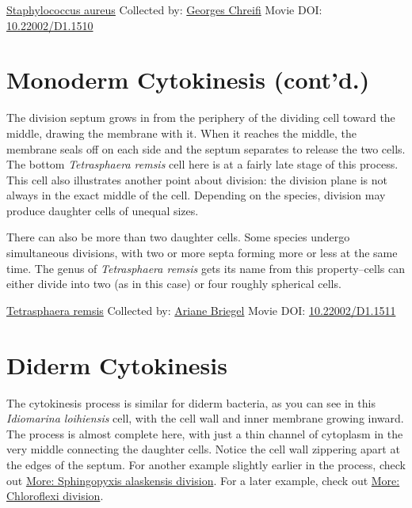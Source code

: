 \documentclass[]{tufte-book}
\begin{document}
\hypertarget{htmlwidget-573431b2be6eb9f99b11}{}

\label{fig:5-4}\protect\hyperlink{tree}{Staphylococcus aureus} Collected by: \protect\hyperlink{georges_chreifi}{Georges Chreifi} Movie DOI: \href{https://doi.org/10.22002/D1.1510}{10.22002/D1.1510}

\hypertarget{monoderm-cytokinesis-contd.}{%
\section{Monoderm Cytokinesis (cont'd.)}\label{monoderm-cytokinesis-contd.}}

The division septum grows in from the periphery of the dividing cell toward the middle, drawing the membrane with it. When it reaches the middle, the membrane seals off on each side and the septum separates to release the two cells. The bottom \emph{Tetrasphaera remsis} cell here is at a fairly late stage of this process. This cell also illustrates another point about division: the division plane is not always in the exact middle of the cell. Depending on the species, division may produce daughter cells of unequal sizes.

There can also be more than two daughter cells. Some species undergo simultaneous divisions, with two or more septa forming more or less at the same time. The genus of \emph{Tetrasphaera remsis} gets its name from this property--cells can either divide into two (as in this case) or four roughly spherical cells.



\hypertarget{htmlwidget-598e4830799cbecaeb30}{}

\label{fig:5-5}\protect\hyperlink{tree}{Tetrasphaera remsis} Collected by: \protect\hyperlink{ariane_briegel}{Ariane Briegel} Movie DOI: \href{https://doi.org/10.22002/D1.1511}{10.22002/D1.1511}

\hypertarget{diderm-cytokinesis}{%
\section{Diderm Cytokinesis}\label{diderm-cytokinesis}}

The cytokinesis process is similar for diderm bacteria, as you can see in this \emph{Idiomarina loihiensis} cell, with the cell wall and inner membrane growing inward. The process is almost complete here, with just a thin channel of cytoplasm in the very middle connecting the daughter cells. Notice the cell wall zippering apart at the edges of the septum. For another example slightly earlier in the process, check out \protect\hyperlink{Sphingopyxis_alaskensis_division}{More: Sphingopyxis alaskensis division}. For a later example, check out \protect\hyperlink{Chloroflexi_division}{More: Chloroflexi division}.
\end{document}
